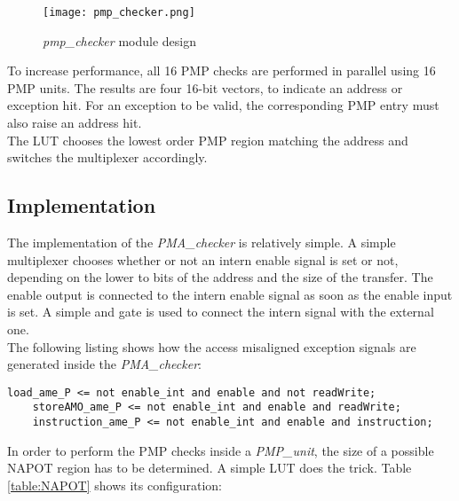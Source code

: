 \begin{figure}[H]
	\centering
	\texttt{[image: pmp\_checker.png]}
	\caption{\textit{pmp\_checker} module design}
	\label{fig:pmpChecker}
\end{figure}

To increase performance, all 16 \ac{PMP} checks are performed in parallel using 16 \ac{PMP} units. The results are four 16-bit vectors, to indicate an address or exception hit. For an exception to be valid, the corresponding \ac{PMP} entry must also raise an address hit. \\
The \ac{LUT} chooses the lowest order \ac{PMP} region matching the address and switches the multiplexer accordingly. 

\subsection{Implementation}
The implementation of the \textit{PMA\_checker} is relatively simple. A simple multiplexer chooses whether or not an intern enable signal is set or not, depending on the lower to bits of the address and the size of the transfer. The enable output is connected to the intern enable signal as soon as the enable input is set. A simple and gate is used to connect the intern signal with the external one. \\
The following listing shows how the access misaligned exception signals are generated inside the \textit{PMA\_checker}:

\begin{lstlisting}[style=vhdl, caption=access misaligend exception generation]
	load_ame_P <= not enable_int and enable and not readWrite;
	storeAMO_ame_P <= not enable_int and enable and readWrite;
	instruction_ame_P <= not enable_int and enable and instruction;
\end{lstlisting}

In order to perform the \ac{PMP} checks inside a \textit{PMP\_unit}, the size of a possible \ac{NAPOT} region has to be determined. A simple \ac{LUT} does the trick. Table \ref{table:NAPOT} shows its configuration:

